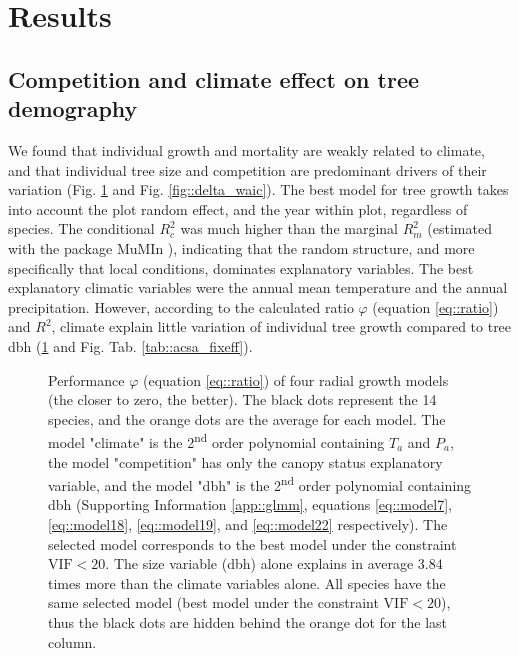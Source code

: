 \section{Results}

\subsection{Competition and climate effect on tree demography}

We found that individual growth and mortality are weakly related to climate, and that individual tree size and competition are predominant drivers of their variation (Fig. \ref{fig::delta_aic} and Fig. \ref{fig::delta_waic}). The best model for tree growth takes into account the plot random effect, and the year within plot, regardless of species. The conditional $ R_c^2 $ was much higher than the marginal $ R_m^2 $ (estimated with the package MuMIn \citep{MuMIn}), indicating that the random structure, and more specifically that local conditions, dominates explanatory variables. The best explanatory climatic variables were the annual mean temperature and the annual precipitation. However, according to the calculated ratio $ \varphi $ (equation \ref{eq::ratio}) and $ R^2 $, climate explain little variation of individual tree growth compared to tree dbh (\ref{fig::delta_aic} and Fig. Tab. \ref{tab::acsa_fixeff}).

\begin{figure}
	\centering
	
	\caption{Performance $ \varphi $ (equation \ref{eq::ratio}) of four radial growth models (the closer to zero, the better). The black dots represent the 14 species, and the orange dots are the average for each model. The model "climate" is the 2\textsuperscript{nd} order polynomial containing $ T_a $ and $ P_a $, the model "competition" has only the canopy status explanatory variable, and the model "dbh" is the 2\textsuperscript{nd} order polynomial containing dbh (Supporting Information \ref{app::glmm}, equations \eqref{eq::model7}, \eqref{eq::model18}, \eqref{eq::model19}, and \eqref{eq::model22} respectively). The selected model corresponds to the best model under the constraint $ \text{VIF} < 20 $. The size variable (dbh) alone explains in average $ 3.84 $ times more than the climate variables alone. All species have the same selected model (\ie best model under the constraint $ \text{VIF} < 20 $), thus the black dots are hidden behind the orange dot for the last column. \label{fig::delta_aic}}
\end{figure}

